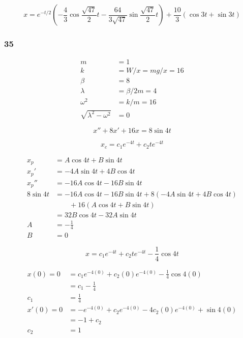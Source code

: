 \documentclass{article}
\begin{document}
\[x = e^{-t / 2} \left( -\frac{4}{3} \cos \frac{\sqrt{47}}{2} t - \frac{64}{3 \sqrt{47}} \sin \frac{\sqrt{47}}{2} t \right) + \frac{10}{3} (\cos 3t + \sin 3t)\]

\subsubsection{35}

\begin{align*}
  m                           & = 1                    \\
  k                           & = W / x = m g / x = 16 \\
  \beta                       & = 8                    \\
  \lambda                     & = \beta / 2 m = 4      \\
  \omega^2                    & = k / m = 16           \\
  \sqrt{\lambda^2 - \omega^2} & = 0
\end{align*}

\[x'' + 8 x' + 16 x = 8 \sin 4t\]

\[x_c = c_1 e^{-4t} + c_2 t e^{-4t}\]

\begin{align*}
  x_p       & = A \cos 4t + B \sin 4t                                         \\
  x_p'      & = -4 A \sin 4t + 4 B \cos 4t                                    \\
  x_p''     & = -16 A \cos 4t - 16 B \sin 4t                                  \\
  8 \sin 4t & = -16 A \cos 4t - 16 B \sin 4t + 8 (-4 A \sin 4t + 4 B \cos 4t) \\
            & \qquad + 16 (A \cos 4t + B \sin 4t)                             \\
            & = 32 B \cos 4t - 32 A \sin 4t                                   \\
  A         & = -\frac{1}{4}                                                  \\
  B         & = 0
\end{align*}

\[x = c_1 e^{-4t} + c_2 t e^{-4t} - \frac{1}{4} \cos 4t\]

\begin{align*}
  x(0) = 0  & = c_1 e^{-4 (0)} + c_2 (0) e^{-4 (0)} - \frac{1}{4} \cos 4 (0)     \\
            & = c_1 - \frac{1}{4}                                                \\
  c_1       & = \frac{1}{4}                                                      \\
  x'(0) = 0 & = -e^{-4 (0)} + c_2 e^{-4 (0)} - 4 c_2 (0) e^{-4 (0)} + \sin 4 (0) \\
            & = -1 + c_2                                                         \\
  c_2       & = 1
\end{align*}
\end{document}
